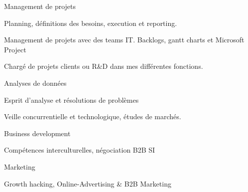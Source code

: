 

\begin{cventries}
	
	\zcventry
	{Management de projets} %
	{
		\begin{cvitems} %
			\item {Planning, définitions des besoins, execution et reporting.}
			\item {Management de projets avec des teams IT. Backlogs, gantt charts et Microsoft Project}
			\item {Chargé de projets clients ou R\&D dans mes différentes fonctions.}
		\end{cvitems}
	}
	
	\zcventry
	{Analyses de données} %
	{
		\begin{cvitems} %
			\item {Esprit d'analyse et résolutions de problèmes}
			\item {Veille concurrentielle et technologique, études de marchés.}
		\end{cvitems}
	}
	
	\zcventry
	{Business development} %
	{
		\begin{cvitems} %
			\item {Compétences interculturelles, négociation B2B SI}
		\end{cvitems}
	}
	
	\zcventry
	{Marketing} %
	{
		\begin{cvitems} %
			\item {Growth hacking, Online-Advertising \& B2B Marketing}
		\end{cvitems}
	}
	
\end{cventries}


